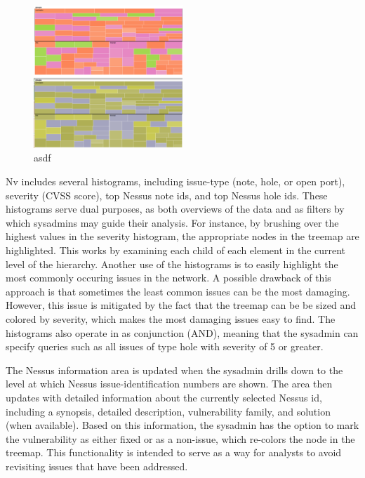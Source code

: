\documentclass{acm_proc_article-sp}
\begin{document}
\begin{figure}
  \centering
  \includegraphics[width=0.5\textwidth]{../screenshots/cb_version_both}
  \caption{asdf}
\end{figure}

Nv includes several histograms, including issue-type (note, hole, or open port), severity (CVSS score), top Nessus note ids, and top Nessus hole ids.
These histograms serve dual purposes, as both overviews of the data and as filters by which sysadmins may guide their analysis.
For instance, by brushing over the highest values in the severity histogram, the appropriate nodes in the treemap are highlighted.
This works by examining each child of each element in the current level of the hierarchy.
Another use of the histograms is to easily highlight the most commonly occuring issues in the network.
A possible drawback of this approach is that sometimes the least common issues can be the most damaging.
However, this issue is mitigated by the fact that the treemap can be be sized and colored by severity, which makes the most damaging issues easy to find.
The histograms also operate in as conjunction (AND), meaning that the sysadmin can specify queries such as all issues of type hole with severity of 5 or greater.

The Nessus information area is updated when the sysadmin drills down to the level at which Nessus issue-identification numbers are shown.
The area then updates with detailed information about the currently selected Nessus id, including a synopsis, detailed description, vulnerability family, and solution (when available).
Based on this information, the sysadmin has the option to mark the vulnerability as either fixed or as a non-issue, which re-colors the node in the treemap.
This functionality is intended to serve as a way for analysts to avoid revisiting issues that have been addressed.
\end{document}
